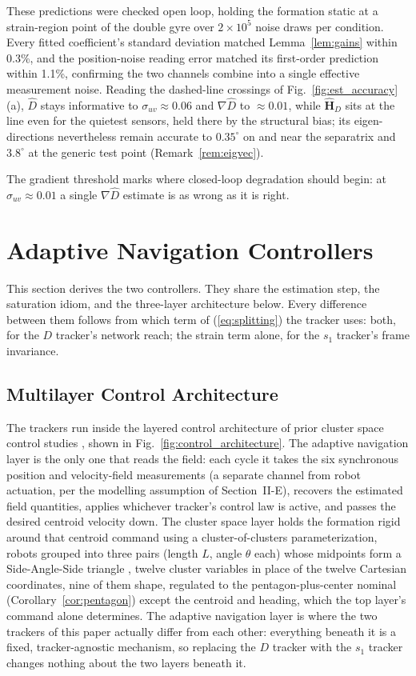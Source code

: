 \documentclass[lettersize,journal]{IEEEtran}
\begin{document}
These predictions were checked open loop, holding the formation static
at a strain-region point of the double gyre over $2 \times 10^5$ noise
draws per condition. Every fitted coefficient's standard deviation
matched Lemma~\ref{lem:gains} within 0.3\%, and the position-noise
reading error matched its first-order prediction within 1.1\%,
confirming the two channels combine into a single effective measurement
noise. Reading the dashed-line crossings of Fig.~\ref{fig:est_accuracy}(a),
$\hat{D}$ stays informative to $\sigma_{uv} \approx 0.06$ and
$\nabla\hat{D}$ to $\approx 0.01$, while $\hat{\mathbf{H}}_D$ sits at
the line even for the quietest sensors, held there by the structural
bias; its eigen-directions nevertheless remain accurate to $0.35^\circ$
on and near the separatrix and $3.8^\circ$ at the generic test point
(Remark~\ref{rem:eigvec}).

The gradient threshold marks where closed-loop degradation should
begin: at $\sigma_{uv} \approx 0.01$ a single $\nabla\hat{D}$ estimate
is as wrong as it is right.

\section{Adaptive Navigation Controllers}
\label{sec:controllers}

This section derives the two controllers. They share the estimation
step, the saturation idiom, and the three-layer architecture below.
Every difference between them follows from which term of
(\ref{eq:splitting}) the tracker uses: both, for the $D$ tracker's
network reach; the strain term alone, for the $s_1$ tracker's frame
invariance.

\subsection{Multilayer Control Architecture}
\label{sec:arch}

The trackers run inside the layered control architecture of prior
cluster space control studies \cite{14,28,27,30}, shown in
Fig.~\ref{fig:control_architecture}. The adaptive navigation layer is
the only one that reads the field: each cycle it takes the six
synchronous position and velocity-field measurements (a separate
channel from robot actuation, per the modelling assumption of
Section~\mbox{II-E}), recovers the estimated field quantities, applies
whichever tracker's control law
is active, and passes the desired centroid
velocity down. The cluster space layer holds the formation rigid
around that centroid command using a cluster-of-clusters
parameterization, robots grouped into three pairs (length $L$, angle
$\theta$ each) whose midpoints form a Side-Angle-Side triangle
\cite{31}, twelve cluster variables in place of the twelve Cartesian
coordinates, nine of them shape, regulated to the pentagon-plus-center nominal
(Corollary~\ref{cor:pentagon}) except the centroid and heading, which
the top layer's command alone determines. The adaptive navigation layer
is where the two trackers of this paper actually differ from each other: everything
beneath it is a fixed, tracker-agnostic mechanism, so replacing the $D$
tracker with the $s_1$ tracker changes nothing about the two layers
beneath it.
\end{document}
